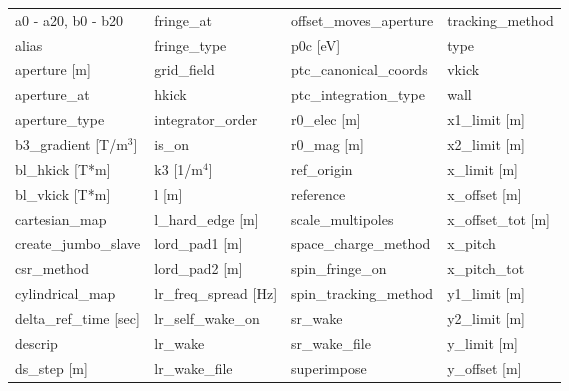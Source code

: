 \begin{tabular}{llll} \toprule
a0 - a20, b0 - b20             & fringe_at                      & offset_moves_aperture          & tracking_method                \\
alias                          & fringe_type                    & p0c [eV]                       & type                           \\
aperture [m]                   & grid_field                     & ptc_canonical_coords           & vkick                          \\
aperture_at                    & hkick                          & ptc_integration_type           & wall                           \\
aperture_type                  & integrator_order               & r0_elec [m]                    & x1_limit [m]                   \\
b3_gradient [T/m$^3$]          & is_on                          & r0_mag [m]                     & x2_limit [m]                   \\
bl_hkick [T*m]                 & k3 [1/m$^4$]                   & ref_origin                     & x_limit [m]                    \\
bl_vkick [T*m]                 & l [m]                          & reference                      & x_offset [m]                   \\
cartesian_map                  & l_hard_edge [m]                & scale_multipoles               & x_offset_tot [m]               \\
create_jumbo_slave             & lord_pad1 [m]                  & space_charge_method            & x_pitch                        \\
csr_method                     & lord_pad2 [m]                  & spin_fringe_on                 & x_pitch_tot                    \\
cylindrical_map                & lr_freq_spread [Hz]            & spin_tracking_method           & y1_limit [m]                   \\
delta_ref_time [sec]           & lr_self_wake_on                & sr_wake                        & y2_limit [m]                   \\
descrip                        & lr_wake                        & sr_wake_file                   & y_limit [m]                    \\
ds_step [m]                    & lr_wake_file                   & superimpose                    & y_offset [m]                   \\

\end{tabular}
